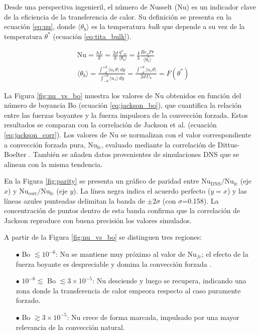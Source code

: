 Desde una perspectiva ingenieril, el número de Nusselt (Nu) es un indicador clave de la eficiencia de la transferencia de calor. Su definición se presenta en la ecuación \ref{eq:nu}, donde $\langle \theta_b \rangle$ es la temperatura \textit{bulk} que depende a su vez de la temperatura $\theta^*$ (ecuación \ref{eq:tita_bulk}).

\begin{align}
&\text{Nu} = \frac{h L}{k} = \frac{2d}{k} \frac{q''_w}{\langle \theta_b \rangle} = \frac{4}{3} \frac{Re_o Pr}{\langle \theta^*_b \rangle}	
\label{eq:nu} \\
&\langle \theta_b \rangle = \frac{\int_{-d}^{+d} \langle u_x \theta \rangle \, dy}{\int_{-d}^{+d} \langle u_x \rangle \, dy} = \frac{\int_{-d}^{+d} \langle u_x \theta \rangle }{2d \, U_b} = F(\theta^*)
\label{eq:tita_bulk}
\end{align}

La Figura \ref{fig:nu_vs_bo} muestra los valores de Nu obtenidos en función del número de boyancia Bo (ecuación \ref{eq:jackson_bo}), que cuantifica la relación entre las fuerzas boyantes y la fuerza impulsora de la convección forzada. Estos resultados se comparan con la correlación de Jackson et al. \cite{jackson1989studies} (ecuación \ref{eq:jackson_corr}). Los valores de Nu se normalizan con el valor correspondiente a convección forzada pura, Nu$_{\text{fc}}$, evaluado mediante la correlación de Dittus-Boelter \cite{incropera}. También se añaden datos provenientes de simulaciones DNS \cite{you2003direct} que se alinean con la misma tendencia.

En la Figura \ref{fig:parity} se presenta un gráfico de paridad entre $\text{Nu}_{\text{DNS}}/\text{Nu}_{\text{fc}}$ (eje $x$) y $\text{Nu}_{\text{corr}}/\text{Nu}_{\text{fc}}$ (eje $y$). La línea negra indica el acuerdo perfecto ($y=x$) y las líneas azules punteadas delimitan la banda de $\pm2\sigma$ (con $\sigma$=0.158). La concentración de puntos dentro de esta banda confirma que la correlación de Jackson reproduce con buena precisión los valores simulados.

A partir de la Figura \ref{fig:nu_vs_bo} se distinguen tres regiones:

\begin{itemize}
  \item[$\bullet$] Bo $\lesssim 10^{-6}$: Nu se mantiene muy próximo al valor de Nu$_{fc}$; el efecto de la fuerza boyante es despreciable y domina la convección forzada  \cite{li2021development}.
  \item[$\bullet$] $10^{-6} \lesssim$ Bo $\lesssim 3 \times 10^{-5}$: Nu desciende y luego se recupera, indicando una zona donde la transferencia de calor empeora respecto al caso puramente forzado.
  \item[$\bullet$] Bo $\gtrsim 3 \times 10^{-5}$: Nu crece de forma marcada, impulsado por una mayor relevancia de la convección natural.
\end{itemize}

